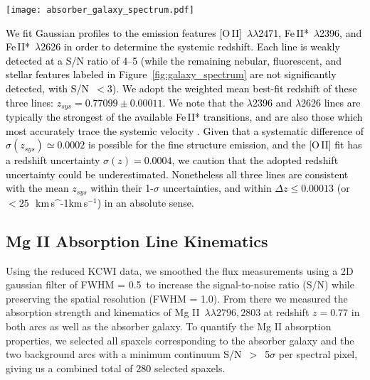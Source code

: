 \documentclass[twocolumn]{aastex62}
\newcommand{\MgII}{Mg\tiny{ }\footnotesize{II}\normalsize{ }}
\newcommand{\kms}{\ifmmode\,{\rm km}\,{\rm s}^{-1}\else km$\,$s$^{-1}$\fi}
\begin{document}
\begin{figure*}[htb!]
\centerline{
\texttt{[image: absorber\_galaxy\_spectrum.pdf]}
}
\caption{
\textcolor{black}{KCWI spectrum of the absorber galaxy. The unsmoothed spectrum is shown in grey, while the black line is a running median over 7 pixels. The error spectrum is shown in pink. The prominent broad emission feature at $\sim$4770~\AA\ is scattered Ly$\alpha$ emission from the background $z\simeq2.9$ arcs. 
Notable spectral features of the absorber galaxy are labeled (for $z=0.771$). Color coding indicates the physical origin of each line (yellow: stellar photospheric absorption; red: interstellar absorption; blue: fluorescent fine structure emission; magenta: nebular emission). 
Interstellar absorption from \MgII, Mg~{\sc i}, and Fe~{\sc ii} are prominent in the spectrum. Fine structure Fe~{\sc ii}* and nebular [O~{\sc ii}] emission are weakly detected. }
}\label{fig:galaxy_spectrum}
\end{figure*}


\textcolor{black}{We fit Gaussian profiles to the emission features [O\,II]~$\lambda\lambda$2471, Fe\,II*~$\lambda$2396, and Fe\,II*~$\lambda$2626 in order to determine the systemic redshift. Each line is weakly detected at a S/N ratio of 4--5 (while the remaining nebular, fluorescent, and stellar features labeled in Figure~\ref{fig:galaxy_spectrum} are not significantly detected, with S/N~$<3$). We adopt the weighted mean best-fit redshift of these three lines: $z_{sys} = 0.77099 \pm 0.00011$. 
We note that the $\lambda$2396 and $\lambda$2626 lines are typically the strongest of the available Fe\,II* transitions, and are also those which most accurately trace the systemic velocity \citep[typically within 50~\kms; e.g.][]{Kornei2013}. Given that a systematic difference of $\sigma(z_{sys})\simeq0.0002$ is possible for the fine structure emission, and the [O\,II] fit has a redshift uncertainty $\sigma(z)=0.0004$, we caution that the adopted redshift uncertainty could be underestimated. 
Nonetheless all three lines are consistent with the mean $z_{sys}$ within their 1-$\sigma$ uncertainties, and within $\Delta z \leq 0.00013$ (or $<25$~\kms) in an absolute sense. }


\subsection{\MgII Absorption Line Kinematics}

Using the reduced KCWI data, we smoothed the flux measurements using a 2D gaussian filter of FWHM = 0.5\arcsec~to increase the signal-to-noise ratio (S/N) while preserving the spatial resolution (FWHM = 1.0\arcsec). From there we measured the absorption strength and kinematics of \MgII\,$\lambda\lambda2796, 2803$ at redshift $z=0.77$ in both arcs as well as the absorber galaxy. To quantify the \MgII absorption properties, we selected all spaxels corresponding to the absorber galaxy and the two background arcs with a minimum continuum \textcolor{black}{S/N~$>$~5$\sigma$} per spectral pixel, giving us a combined total of \textcolor{black}{280} selected spaxels. 
\end{document}
